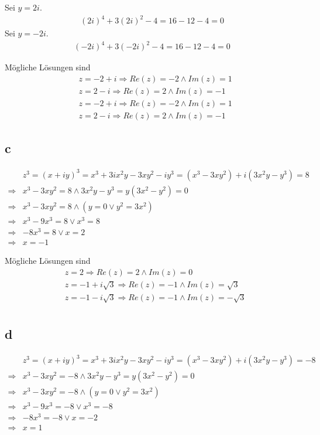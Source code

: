 \documentclass[a4paper,10pt]{article}
\begin{document}
Sei $y = 2i$.
\begin{align}
 (2i)^4 + 3(2i)^2 - 4 = 16 - 12 - 4 = 0
\end{align}
Sei $y = -2i$.
\begin{align}
 (-2i)^4 + 3(-2i)^2 - 4 = 16 - 12 - 4 = 0
\end{align}

Mögliche Lösungen sind
\begin{align*}
 & z = -2 + i \Rightarrow Re(z) = -2 \land Im(z) = 1\\
 & z = 2 - i \Rightarrow Re(z) = 2 \land Im(z) = -1\\
 & z = -2 + i \Rightarrow Re(z) = -2 \land Im(z) = 1\\
 & z = 2 - i \Rightarrow Re(z) = 2 \land Im(z) = -1
\end{align*}

\subsection*{c}

\begin{align*}
 & z^3 = (x + iy)^3 = x^3 + 3ix^2y - 3xy^2 - iy^3 = (x^3 - 3xy^2) + i(3x^2y - y^3) = 8\\
 \Rightarrow & x^3 - 3xy^2 = 8 \land 3x^2y - y^3 = y(3x^2 - y^2) = 0\\
 \Rightarrow & x^3 - 3xy^2 = 8 \land (y = 0 \lor y^2 = 3x^2)\\
 \Rightarrow & x^3 - 9x^3 = 8 \lor x^3 = 8 \\
 \Rightarrow & -8x^3 = 8 \lor x = 2\\
 \Rightarrow & x = -1
\end{align*}

Mögliche Lösungen sind
\begin{align*}
 & z = 2 \Rightarrow Re(z) = 2 \land Im(z) = 0\\
 & z = -1 + i\sqrt{3} \Rightarrow Re(z) = -1 \land Im(z) = \sqrt{3}\\
 & z = -1 - i\sqrt{3} \Rightarrow Re(z) = -1 \land Im(z) = -\sqrt{3}\\
\end{align*}

\subsection*{d}

\begin{align*}
 & z^3 = (x + iy)^3 = x^3 + 3ix^2y - 3xy^2 - iy^3 = (x^3 - 3xy^2) + i(3x^2y - y^3) = -8\\
 \Rightarrow & x^3 - 3xy^2 = -8 \land 3x^2y - y^3 = y(3x^2 - y^2) = 0\\
 \Rightarrow & x^3 - 3xy^2 = -8 \land (y = 0 \lor y^2 = 3x^2)\\
 \Rightarrow & x^3 - 9x^3 = -8 \lor x^3 = -8 \\
 \Rightarrow & -8x^3 = -8 \lor x = -2\\
 \Rightarrow & x = 1
\end{align*}
\end{document}
